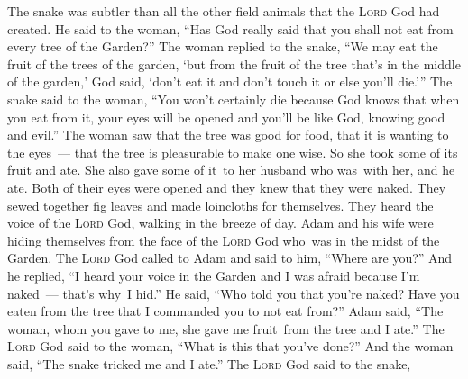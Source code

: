 
\begin{inparaenum}
   The snake was subtler than all the other field animals that the \textsc{Lord} God had created. He said to the woman, ``Has God really said that you shall not eat from every tree of the Garden?''%
   The woman replied to the snake, ``We may eat the fruit of the trees of the garden,%
   `but from the fruit of the tree that's in the middle of the garden,' God said, `don't eat it and don't touch it or else you'll die.'\thinspace''%
   The snake said to the woman, ``You won't certainly die%
   because God knows that when you eat from it, your eyes will be opened and you'll be like God, knowing good and evil.''%
   The woman saw that the tree was good for food, that it is wanting to the eyes~--- that the tree is pleasurable to make one wise. So she took some of its fruit and ate. She also gave some of it\understood\ to her husband who was\understood\ with her, and he ate.%
   Both of their eyes were opened and they knew that they were naked. They sewed together fig leaves and made loincloths for themselves.%
   They heard the voice of the \textsc{Lord} God, walking in the breeze of day. Adam and his wife were hiding themselves from the face of the \textsc{Lord} God who\understood\ was in the midst of the Garden.%
   The \textsc{Lord} God called to Adam and said to him, ``Where are you?''%
   And he replied, ``I heard your voice in the Garden and I was afraid because I'm naked~--- that's why\understood\ I hid.''%
   He said, ``Who told you that you're naked? Have you eaten from the tree that I commanded you to not eat from?''%
   Adam said, ``The woman, whom you gave to me, she gave me fruit\understood\ from the tree and I ate.''%
   The \textsc{Lord} God said to the woman, ``What is this that you've done?'' And the woman said, ``The snake tricked me and I ate.''%
   The \textsc{Lord} God said to the snake,\smallskip%
  

\end{inparaenum}
